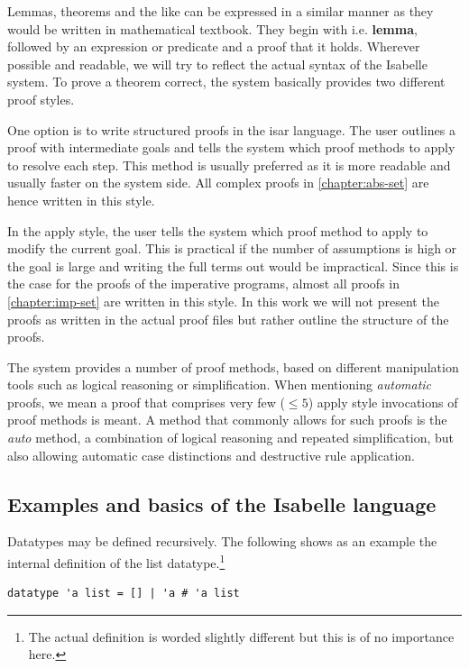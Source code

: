 Lemmas, theorems and the like can be expressed in a similar manner
as they would be written in mathematical textbook.
They begin with i.e. \textbf{lemma}, followed by an
expression or predicate and a proof that it holds.
Wherever possible and readable, we will try to reflect the actual
syntax of the Isabelle system.
To prove a theorem correct, the system basically provides two different
proof styles.

One option is to write structured proofs in the isar language.
The user outlines a proof with intermediate goals
and tells the system which proof methods to apply to
resolve each step.
This method is usually preferred as it is more readable and usually
faster on the system side.
All complex proofs in \autoref{chapter:abs-set} are hence written in this style.

In the apply style, the user tells the system which proof method
to apply to modify the current goal.
This is practical if the number of assumptions
is high or the goal is large and writing the full terms
out would be impractical.
Since this is the case for the proofs of the imperative programs,
almost all proofs in \autoref{chapter:imp-set} are written in this style.
In this work we will not present the proofs as written in the actual
proof files but rather outline the structure of the proofs.

The system provides a number of proof methods,
based on different manipulation tools
such as logical reasoning or simplification.
When mentioning \textit{automatic} proofs, we mean a proof that
comprises very few ($\le 5$) apply style
invocations of proof methods is meant.
A method that commonly allows for such proofs is the \textit{auto} method,
a combination of logical reasoning and repeated simplification,
but also allowing automatic case distinctions and destructive rule application.

\subsection{Examples and basics of the Isabelle language}

Datatypes may be defined recursively.
The following shows as an example the internal definition of the list datatype.\footnote{
    The actual definition is worded slightly different but this is of no importance here.
}

\begin{lstlisting}[mathescape=true, language=Isabelle,label=lst:list-def]
datatype 'a list = [] | 'a # 'a list
\end{lstlisting}

